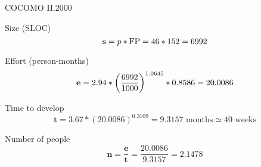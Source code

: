 \begin{frame}[allowframebreaks]{COCOMO II.2000}
	
\begin{block}{Size (SLOC)}\begin{equation*}
%
	\mSize = p * \mFP = 46 * 152 = 6992
%
\end{equation*}\end{block}





\begin{block}{Effort (person-months)}\begin{equation*}
%
	\mEffort = 2.94 * { \left( \frac{6992}{1000} \right) }^{1.0645} * 0.8586 = 20.0086
%
\end{equation*}\end{block}

	
\framebreak	
	
	
\begin{block}{Time to develop}\begin{equation*}
%
	\mathbf{t} = 3.67 * {\left( 20.0086 \right)}^{0.3109} = 9.3157 \text{ months} \simeq 40 \text{ weeks}
%
\end{equation*}\end{block}



\begin{block}{Number of people}\begin{equation*}
%
	\mathbf{n} = \frac{\mathbf{e}}{\mathbf{t}} = \frac{20.0086}{9.3157} = 2.1478
%
\end{equation*}\end{block}





	
\end{frame}

























